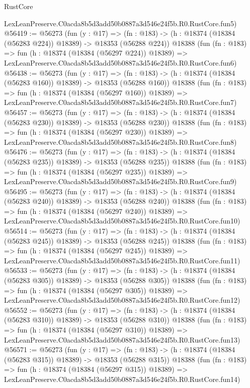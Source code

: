 \begin{lexlean}{RustCore}
\begin{coremodule}
    LexLeanPreserve.C0acda8b5d3add50b0887a3d546e24f5b.R0.RustCore.fun5)
@56419 := @56273
    (fun (y : @17) =>
    (fn : @183) -> (h : @18374 (@18384 (@56283 @224)) @18389) -> @18353 (@56288 @224))
    @18388
    (fun (fn : @183) =>
    fun (h : @18374 (@18384 (@56297 @224)) @18389) =>
    LexLeanPreserve.C0acda8b5d3add50b0887a3d546e24f5b.R0.RustCore.fun6)
@56438 := @56273
    (fun (y : @17) =>
    (fn : @183) -> (h : @18374 (@18384 (@56283 @160)) @18389) -> @18353 (@56288 @160))
    @18388
    (fun (fn : @183) =>
    fun (h : @18374 (@18384 (@56297 @160)) @18389) =>
    LexLeanPreserve.C0acda8b5d3add50b0887a3d546e24f5b.R0.RustCore.fun7)
@56457 := @56273
    (fun (y : @17) =>
    (fn : @183) -> (h : @18374 (@18384 (@56283 @230)) @18389) -> @18353 (@56288 @230))
    @18388
    (fun (fn : @183) =>
    fun (h : @18374 (@18384 (@56297 @230)) @18389) =>
    LexLeanPreserve.C0acda8b5d3add50b0887a3d546e24f5b.R0.RustCore.fun8)
@56476 := @56273
    (fun (y : @17) =>
    (fn : @183) -> (h : @18374 (@18384 (@56283 @235)) @18389) -> @18353 (@56288 @235))
    @18388
    (fun (fn : @183) =>
    fun (h : @18374 (@18384 (@56297 @235)) @18389) =>
    LexLeanPreserve.C0acda8b5d3add50b0887a3d546e24f5b.R0.RustCore.fun9)
@56495 := @56273
    (fun (y : @17) =>
    (fn : @183) -> (h : @18374 (@18384 (@56283 @240)) @18389) -> @18353 (@56288 @240))
    @18388
    (fun (fn : @183) =>
    fun (h : @18374 (@18384 (@56297 @240)) @18389) =>
    LexLeanPreserve.C0acda8b5d3add50b0887a3d546e24f5b.R0.RustCore.fun10)
@56514 := @56273
    (fun (y : @17) =>
    (fn : @183) -> (h : @18374 (@18384 (@56283 @245)) @18389) -> @18353 (@56288 @245))
    @18388
    (fun (fn : @183) =>
    fun (h : @18374 (@18384 (@56297 @245)) @18389) =>
    LexLeanPreserve.C0acda8b5d3add50b0887a3d546e24f5b.R0.RustCore.fun11)
@56533 := @56273
    (fun (y : @17) =>
    (fn : @183) -> (h : @18374 (@18384 (@56283 @305)) @18389) -> @18353 (@56288 @305))
    @18388
    (fun (fn : @183) =>
    fun (h : @18374 (@18384 (@56297 @305)) @18389) =>
    LexLeanPreserve.C0acda8b5d3add50b0887a3d546e24f5b.R0.RustCore.fun12)
@56552 := @56273
    (fun (y : @17) =>
    (fn : @183) -> (h : @18374 (@18384 (@56283 @310)) @18389) -> @18353 (@56288 @310))
    @18388
    (fun (fn : @183) =>
    fun (h : @18374 (@18384 (@56297 @310)) @18389) =>
    LexLeanPreserve.C0acda8b5d3add50b0887a3d546e24f5b.R0.RustCore.fun13)
@56571 := @56273
    (fun (y : @17) =>
    (fn : @183) -> (h : @18374 (@18384 (@56283 @315)) @18389) -> @18353 (@56288 @315))
    @18388
    (fun (fn : @183) =>
    fun (h : @18374 (@18384 (@56297 @315)) @18389) =>
    LexLeanPreserve.C0acda8b5d3add50b0887a3d546e24f5b.R0.RustCore.fun14)

\end{coremodule}
\end{lexlean}
